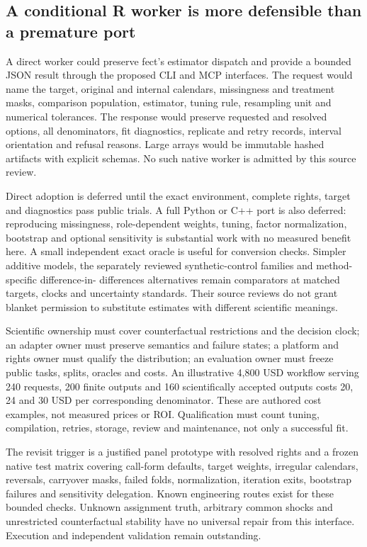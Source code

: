 \subsection{A conditional R worker is more defensible than a premature port}
A direct worker could preserve fect's estimator dispatch and provide a
bounded JSON result through the proposed CLI and MCP interfaces. The
request would name the target, original and internal calendars, missingness
and treatment masks, comparison population, estimator, tuning rule,
resampling unit and numerical tolerances. The response would preserve
requested and resolved options, all denominators, fit diagnostics,
replicate and retry records, interval orientation and refusal reasons.
Large arrays would be immutable hashed artifacts with explicit schemas.
No such native worker is admitted by this source review.
\citep{exec24_fect_choice}

Direct adoption is deferred until the exact environment, complete rights,
target and diagnostics pass public trials. A full Python or C++ port is
also deferred: reproducing missingness, role-dependent weights, tuning,
factor normalization, bootstrap and optional sensitivity is substantial
work with no measured benefit here. A small independent exact oracle is
useful for conversion checks. Simpler additive models, the separately
reviewed synthetic-control families and method-specific difference-in-
differences alternatives remain comparators at matched targets, clocks
and uncertainty standards. Their source reviews do not grant blanket
permission to substitute estimates with different scientific meanings.
\citep{exec24_fect_choice}

Scientific ownership must cover counterfactual restrictions and the
decision clock; an adapter owner must preserve semantics and failure
states; a platform and rights owner must qualify the distribution; an
evaluation owner must freeze public tasks, splits, oracles and costs.
An illustrative 4,800 USD workflow serving 240 requests, 200 finite
outputs and 160 scientifically accepted outputs costs 20, 24 and 30 USD
per corresponding denominator. These are authored cost examples, not
measured prices or ROI. Qualification must count tuning, compilation,
retries, storage, review and maintenance, not only a successful fit.
\citep{exec24_fect_choice}

The revisit trigger is a justified panel prototype with resolved rights
and a frozen native test matrix covering call-form defaults, target
weights, irregular calendars, reversals, carryover masks, failed folds,
normalization, iteration exits, bootstrap failures and sensitivity
delegation. Known engineering routes exist for these bounded checks.
Unknown assignment truth, arbitrary common shocks and unrestricted
counterfactual stability have no universal repair from this interface.
Execution and independent validation remain outstanding.
\citep{exec24_fect_choice}

